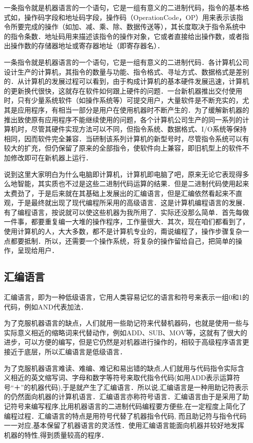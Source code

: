 一条指令就是机器语言的一个语句，它是一组有意义的二进制代码，指令的基本格式如，操作码字段和地址码字段，操作码（OperationCode，OP）用来表示该指令所要完成的操作（如加、减、乘、除、数据传送等），其长度取决于指令系统中的指令条数．地址码用来描述该指令的操作对象，它或者直接给出操作数，或者指出操作数的存储器地址或寄存器地址（即寄存器名）．

一条指令就是机器语言的一个语句，它是一组有意义的二进制代码．各计算机公司设计生产的计算机，其指令的数量与功能、指令格式、寻址方式、数据格式是差别的．从计算机的发展过程可以看到，由于构成计算机的基本硬件发展迅速，计算机的更新换代很快，这就存在软件如何跟上硬件的问题．一台新机器推出交付使用时，只有少量系统软件（如操作系统等）可提交用户，大量软件是不断充实的，尤其是应用程序，有相当一部分是用户在使用机器时不断产生的．为了缓解新机器的推出致使原有应用程序不能继续使用的问题，各个计算机公司生产的同一系列的计算机时，尽管其硬件实现方法可以不同，但指令系统、数据格式、I/O系统等保持相同，因而软件完全兼容．当研制该系列计算机的新型号时，尽管指令系统可以有较大的扩充，但仍保留了原来的全部指令，使软件向上兼容，即旧机型上的软件不加修改即可在新机器上运行．

说到这里大家明白为什么电脑即计算机，计算机即电脑了吧，原来无论它表现得多么地智能，其实质也不过是这些二进制代码运算的结果．但是二进制代码使用起来太费劲了，于是后来就在其基础上发展出的汇编语言，但是汇编依然看起来不直观，于是最终就出现了现代编程所采用的高级语言．这是计算机编程语言的发展．有了编程语言，按说就可以使这些机器为我所用了．实际还没那么简单．首先每做一件事，都要重复编一大堆的操作程序，工作量很大．其次，现在咱们都看到了，使用计算机的人，大大多数，都不是计算机专业的，甭说编程了，操作步骤复杂一点都要抵制．所以，还需要一个操作系统，将复杂的操作留给自己，把简单的操作，呈现给用户．

\subsection{汇编语言}\label{CpLgg_sub2}

汇编语言，即为一种低级语言，它用人类容易记忆的语言和符号来表示一组0和1的代码，例如AND代表加法．

为了克服机器语言的缺点，人们就用一些助记符来代替机器码，也就是使用一些与实际意义相近的缩略词来代替动作，例如ADD、SUB、MOV等，这就有了很大的进步，可以方便的编写，但是它仍然是对机器进行操作的，相较于高级程序语言更接近于底层，所以汇编语言是低级语言．

为了克服机器语言难读、难编、难记和易出错的缺点,人们就用与代码指令实际含义相近的英文缩写词、字母和数字等符号来取代指令代码(如用ADD表示运算符号“＋”的机器代码),于是就产生了汇编语言．所以说,汇编语言是一种用助记符表示的仍然面向机器的计算机语言．汇编语言亦称符号语言．汇编语言由于是采用了助记符号来编写程序,比用机器语言的二进制代码编程要方便些,在一定程度上简化了编程过程．汇编语言的特点是用符号代替了机器指令代码, 而且助记符与指令代码一一对应,基本保留了机器语言的灵活性．使用汇编语言能面向机器并较好地发挥机器的特性,得到质量较高的程序．

